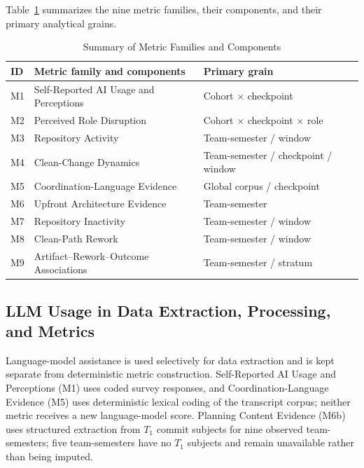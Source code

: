Table~\ref{tab:metrics_summary} summarizes the nine metric families, their
components, and their primary analytical grains.

\begin{table}[t]
\caption{Summary of Metric Families and Components}
\label{tab:metrics_summary}
\centering
\small
\begin{tabular}{@{}>{\raggedright\arraybackslash}p{0.6cm}>{\raggedright\arraybackslash}p{3.8cm}>{\raggedright\arraybackslash}p{2.6cm}@{}}
\toprule
\textbf{ID} & \textbf{Metric family and components} & \textbf{Primary grain} \\
\midrule
M1 & Self-Reported AI Usage and Perceptions & Cohort $\times$ checkpoint \\
M2 & Perceived Role Disruption & Cohort $\times$ checkpoint $\times$ role \\
M3 & Repository Activity & Team-semester / window \\
M4 & Clean-Change Dynamics & Team-semester / checkpoint / window \\
M5 & Coordination-Language Evidence & Global corpus / checkpoint \\
M6 & Upfront Architecture Evidence & Team-semester \\
M7 & Repository Inactivity & Team-semester / window \\
M8 & Clean-Path Rework & Team-semester / window \\
M9 & Artifact--Rework--Outcome Associations & Team-semester / stratum \\
\bottomrule
\end{tabular}
\end{table}


\subsection{LLM Usage in Data Extraction, Processing, and Metrics}
Language-model assistance is used selectively for data extraction and is kept
separate from deterministic metric construction. Self-Reported AI Usage and
Perceptions (M1) uses coded survey responses, and Coordination-Language Evidence
(M5) uses deterministic lexical coding of the transcript corpus; neither metric
receives a new language-model score. Planning Content Evidence (M6b) uses structured extraction from
$T_1$ commit subjects for nine observed team-semesters; five team-semesters have
no $T_1$ subjects and remain unavailable rather than being imputed.

